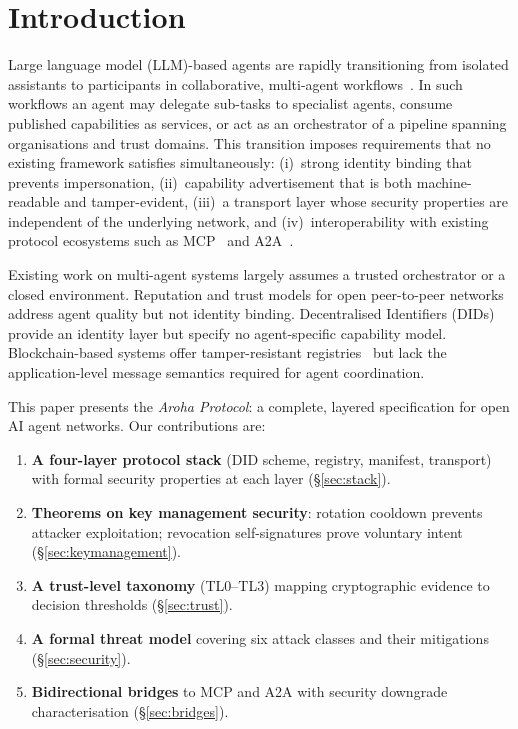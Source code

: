 \documentclass[conference]{IEEEtran}
\begin{document}
\section{Introduction}
\label{sec:intro}

Large language model (LLM)-based agents are rapidly transitioning
from isolated assistants to participants in collaborative,
multi-agent workflows~\cite{guo2024agents}. In such workflows an
agent may delegate sub-tasks to specialist agents, consume
published capabilities as services, or act as an orchestrator of
a pipeline spanning organisations and trust domains. This
transition imposes requirements that no existing framework
satisfies simultaneously: (i)~strong identity binding that
prevents impersonation, (ii)~capability advertisement that is
both machine-readable and tamper-evident, (iii)~a transport layer
whose security properties are independent of the underlying
network, and (iv)~interoperability with existing protocol
ecosystems such as MCP~\cite{anthropic2024mcp} and
A2A~\cite{google2024a2a}.

Existing work on multi-agent systems largely assumes a trusted
orchestrator or a closed environment. Reputation and trust models
for open peer-to-peer networks~\cite{josang2007trust,
kamvar2003eigentrust, sabater2005review} address agent quality
but not identity binding. Decentralised Identifiers
(DIDs)~\cite{w3c2022did} provide an identity layer but specify
no agent-specific capability model. Blockchain-based systems
offer tamper-resistant registries~\cite{nakamoto2008bitcoin,
buterin2014ethereum} but lack the application-level message
semantics required for agent coordination.

This paper presents the \textit{Aroha Protocol}: a complete,
layered specification for open AI agent networks. Our
contributions are:

\begin{enumerate}
  \item \textbf{A four-layer protocol stack} (DID scheme,
    registry, manifest, transport) with formal security
    properties at each layer (\S\ref{sec:stack}).
  \item \textbf{Theorems on key management security}: rotation
    cooldown prevents attacker exploitation; revocation
    self-signatures prove voluntary intent
    (\S\ref{sec:keymanagement}).
  \item \textbf{A trust-level taxonomy} (TL0--TL3) mapping
    cryptographic evidence to decision thresholds
    (\S\ref{sec:trust}).
  \item \textbf{A formal threat model} covering six attack
    classes and their mitigations (\S\ref{sec:security}).
  \item \textbf{Bidirectional bridges} to MCP and A2A with
    security downgrade characterisation
    (\S\ref{sec:bridges}).
\end{enumerate}
\end{document}
